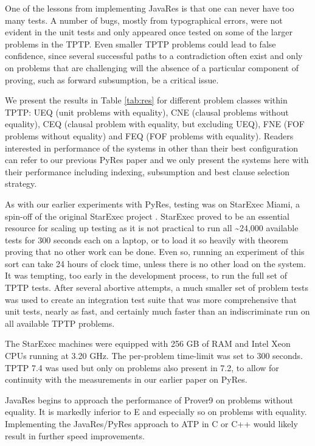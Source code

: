 \documentclass{llncs}
\begin{document}
One of the lessons from implementing JavaRes is that one can never
have too many tests.  A number of bugs, mostly from typographical
errors, were not evident in the unit tests and only appeared once
tested on some of the larger problems in the TPTP.  Even smaller TPTP
problems could lead to false confidence, since several successful
paths to a contradiction often exist and only on problems that are
challenging will the absence of a particular component of proving,
such as forward subsumption, be a critical issue.



We present the results in Table \ref{tab:res} for different problem
classes within TPTP: UEQ (unit problems with equality), CNE (clausal
problems without equality), CEQ (clausal problem with equality, but
excluding UEQ), FNE (FOF problems without equality) and FEQ (FOF
problems with equality).  Readers interested in performance of the
systems in other than their best configuration can refer to our
previous PyRes paper and we only present the systems here with their
performance including indexing, subsumption and best clause selection
strategy.

As with our earlier experiments with PyRes, testing was on StarExec
Miami, a spin-off of the original StarExec project
\cite{SST:IJCAR-2014}. StarExec proved to be an essential resource for
scaling up testing as it is not practical to run all
\textasciitilde24,000 available tests for 300 seconds each on a
laptop, or to load it so heavily with theorem proving that no other
work can be done.  Even so, running an experiment of this sort can
take 24 hours of clock time, unless there is no other load on the
system. It was tempting, too early in the development process, to run
the full set of TPTP tests.  After several abortive attempts, a much
smaller set of problem tests was used to create an integration test
suite that was more comprehensive that unit tests, nearly as fast, and
certainly much faster than an indiscriminate run on all available TPTP
problems.

The StarExec machines were equipped with 256 GB of RAM and Intel Xeon
CPUs running at 3.20 GHz.  The per-problem time-limit was set to 300
seconds. TPTP 7.4 was used but only on problems also present in 7.2,
to allow for continuity with the measurements in our earlier paper on
PyRes.

JavaRes begins to approach the performance of Prover9 on problems without
equality. It is markedly inferior to E and especially so on problems
with equality.  Implementing the JavaRes/PyRes approach to ATP
in C or C++ would likely result in further speed improvements.
\end{document}
